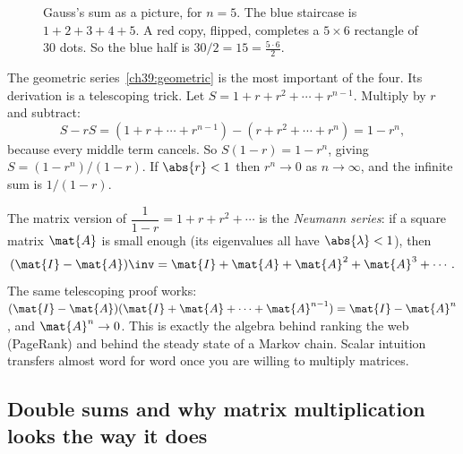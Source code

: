 \begin{figure}[H]
\centering
{}
\caption{Gauss's sum as a picture, for $n=5$. The blue staircase is $1+2+3+4+5$. A red copy,
flipped, completes a $5\times 6$ rectangle of $30$ dots. So the blue half is $30/2 = 15 =
\tfrac{5\cdot 6}{2}$.}
\label{ch39:fig-gauss}
\end{figure}

The geometric series~\eqref{ch39:geometric} is the most important of the four. Its derivation is a
telescoping trick. Let $S = 1 + r + r^2 + \cdots + r^{n-1}$. Multiply by $r$ and subtract:
\[
S - rS = (1 + r + \cdots + r^{n-1}) - (r + r^2 + \cdots + r^n) = 1 - r^n,
\]
because every middle term cancels. So $S(1-r) = 1 - r^n$, giving $S = (1-r^n)/(1-r)$. If
$\abs{r} < 1$ then $r^n \to 0$ as $n \to \infty$, and the infinite sum is $1/(1-r)$.

\begin{connectionbox}
The matrix version of $\dfrac{1}{1-r} = 1 + r + r^2 + \cdots$ is the \emph{Neumann series}: if a
square matrix $\mat{A}$ is small enough (its eigenvalues all have $\abs{\lambda} < 1$), then
\[
(\mat{I} - \mat{A})\inv = \mat{I} + \mat{A} + \mat{A}^2 + \mat{A}^3 + \cdots.
\]
The same telescoping proof works: $(\mat{I}-\mat{A})(\mat{I} + \mat{A} + \cdots + \mat{A}^{n-1}) =
\mat{I} - \mat{A}^n$, and $\mat{A}^n \to 0$. This is exactly the algebra behind ranking the web
(PageRank) and behind the steady state of a Markov chain. Scalar intuition transfers almost word for
word once you are willing to multiply matrices.
\end{connectionbox}

\subsection{Double sums and why matrix multiplication looks the way it does}
\label{ch39:double-sums}

